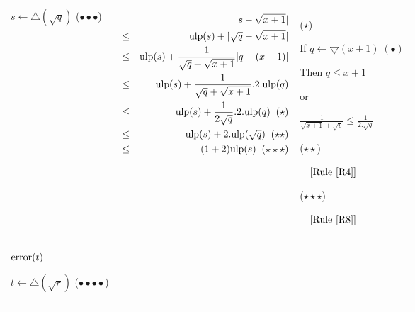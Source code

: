 \documentclass[12pt]{amsart}
\def\pinf{\bigtriangleup}
\def\minf{\bigtriangledown}
\def\ulp{{\rm ulp}}
\newcommand{\U}[1]{\quad \mbox{[Rule~\ref{#1}]}}
\begin{document}
\begin{center}
\begin{tabular}{l l l}
\begin{minipage}{2.5cm}
$s \leftarrow \pinf(\sqrt{q}) $
($\bullet\bullet\bullet$)

\end{minipage} &
\begin{minipage}{7.5cm}

\begin{eqnarray}\nonumber
  &&|s-\sqrt{x+1}| \\\nonumber
  &       \leq& \ulp(s) + |\sqrt{q}-\sqrt{x+1}|\\\nonumber
  &       \leq& \ulp(s) + \frac{1}{\sqrt{q} + \sqrt{x+1}}|q-(x+1)|\\\nonumber
  &       \leq& \ulp(s) + \frac{1}{\sqrt{q} + \sqrt{x+1}}.2.\ulp(q)  \\\nonumber
  &       \leq& \ulp(s) + \frac{1}{2\sqrt{q}}.2.\ulp(q) \;\;(\star) \\\nonumber
  &       \leq& \ulp(s) + 2.\ulp(\sqrt{q}) \;\;(\star\star)\\\nonumber
  &       \leq& (1 + 2) \ulp(s) \;\;(\star\star\star)
\end{eqnarray}


\end{minipage} &
\begin{minipage}{6cm}

($\star$)

If $q \leftarrow \minf(x+1) \;(\bullet)$

Then $q \leq x+1$

or

$\frac{1}{\sqrt{x+1}+\sqrt{v}} \leq \frac{1}{2.\sqrt{q}}$

($\star\star$)

$\U{R4}$

($\star\star\star$)

$\U{R8}$

\end{minipage}\\%
\begin{minipage}{2.5cm}
${\textnormal{error}}(t)$


$t \leftarrow \pinf(\sqrt{r}) $
($\bullet\bullet\bullet\bullet$)

\end{minipage} &
\begin{minipage}{7.5cm}


\end{minipage}
\end{tabular}
\end{center}
\end{document}
